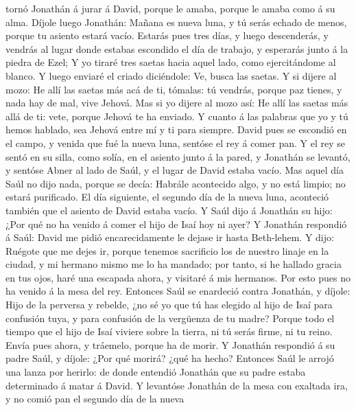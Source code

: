 tornó Jonathán á jurar á David, porque le amaba, porque le amaba como á
su alma.  Díjole luego Jonathán: Mañana es nueva luna, y tú
serás echado de menos, porque tu asiento estará vacío. 
Estarás pues tres días, y luego descenderás, y vendrás al lugar donde
estabas escondido el día de trabajo, y esperarás junto á la piedra de
Ezel;  Y yo tiraré tres saetas hacia aquel lado, como
ejercitándome al blanco.  Y luego enviaré el criado
diciéndole: Ve, busca las saetas. Y si dijere al mozo: He allí las
saetas más acá de ti, tómalas: tú vendrás, porque paz tienes, y nada hay
de mal, vive Jehová.  Mas si yo dijere al mozo así: He allí
las saetas más allá de ti: vete, porque Jehová te ha enviado.
 Y cuanto á las palabras que yo y tú hemos hablado, sea
Jehová entre mí y ti para siempre.  David pues se escondió
en el campo, y venida que fué la nueva luna, sentóse el rey á comer pan.
 Y el rey se sentó en su silla, como solía, en el asiento
junto á la pared, y Jonathán se levantó, y sentóse Abner al lado de
Saúl, y el lugar de David estaba vacío.  Mas aquel día Saúl
no dijo nada, porque se decía: Habrále acontecido algo, y no está
limpio; no estará purificado.  El día siguiente, el segundo
día de la nueva luna, aconteció también que el asiento de David estaba
vacío. Y Saúl dijo á Jonathán su hijo: ¿Por qué no ha venido á comer el
hijo de Isaí hoy ni ayer?  Y Jonathán respondió á Saúl:
David me pidió encarecidamente le dejase ir hasta Beth-lehem.
 Y dijo: Ruégote que me dejes ir, porque tenemos sacrificio
los de nuestro linaje en la ciudad, y mi hermano mismo me lo ha mandado;
por tanto, si he hallado gracia en tus ojos, haré una escapada ahora, y
visitaré á mis hermanos. Por esto pues no ha venido á la mesa del rey.
 Entonces Saúl se enardeció contra Jonathán, y díjole: Hijo
de la perversa y rebelde, ¿no sé yo que tú has elegido al hijo de Isaí
para confusión tuya, y para confusión de la vergüenza de tu madre?
 Porque todo el tiempo que el hijo de Isaí viviere sobre la
tierra, ni tú serás firme, ni tu reino. Envía pues ahora, y tráemelo,
porque ha de morir.  Y Jonathán respondió á su padre Saúl,
y díjole: ¿Por qué morirá? ¿qué ha hecho?  Entonces Saúl le
arrojó una lanza por herirlo: de donde entendió Jonathán que su padre
estaba determinado á matar á David.  Y levantóse Jonathán
de la mesa con exaltada ira, y no comió pan el segundo día de la nueva
